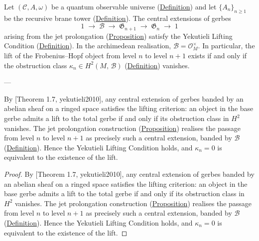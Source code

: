 \begin{proposition}
  \label{prop:yekutieli-lifting}
Let $(\mathcal{C}, A, \omega)$ be a quantum observable universe
(\hyperref[def:quantum-observable-universe]{Definition}) and let
$\{A_n\}_{n \geq 1}$ be the recursive brane tower
(\hyperref[def:recursive-brane-tower]{Definition}).  The central extensions of
gerbes
\[
1 \;\longrightarrow\; \mathcal{B}
  \;\longrightarrow\; \mathfrak{G}_{n+1}
  \;\longrightarrow\; \mathfrak{G}_n
  \;\longrightarrow\; 1
\]
arising from the jet prolongation
(\hyperref[prop:jet-prolongation]{Proposition}) satisfy the Yekutieli Lifting
Condition (\hyperref[def:yekutieli-lifting-condition]{Definition}).  In the
archimedean realisation, $\mathcal{B} = \mathcal{O}_M^{\times}$.  In
particular, the lift of the Frobenius--Hopf object from level $n$ to
level $n{+}1$ exists if and only if the obstruction class
$\kappa_n \in H^2(M,\, \mathcal{B})$
(\hyperref[def:quantum-characteristic-classes]{Definition}) vanishes.

---

By [Theorem 1.7, yekutieli2010], any central extension of gerbes
banded by an abelian sheaf on a ringed space satisfies the lifting
criterion: an object in the base gerbe admits a lift to the total gerbe
if and only if its obstruction class in $H^2$ vanishes.  The jet
prolongation construction
(\hyperref[prop:jet-prolongation]{Proposition}) realises the passage from
level $n$ to level $n{+}1$ as precisely such a central extension,
banded by $\mathcal{B}$
(\hyperref[def:quantum-characteristic-classes]{Definition}).  Hence the
Yekutieli Lifting Condition holds, and $\kappa_n = 0$ is equivalent
to the existence of the lift.
\end{proposition}
\begin{proof}
By [Theorem 1.7, yekutieli2010], any central extension of gerbes
banded by an abelian sheaf on a ringed space satisfies the lifting
criterion: an object in the base gerbe admits a lift to the total gerbe
if and only if its obstruction class in $H^2$ vanishes.  The jet
prolongation construction
(\hyperref[prop:jet-prolongation]{Proposition}) realises the passage from
level $n$ to level $n{+}1$ as precisely such a central extension,
banded by $\mathcal{B}$
(\hyperref[def:quantum-characteristic-classes]{Definition}).  Hence the
Yekutieli Lifting Condition holds, and $\kappa_n = 0$ is equivalent
to the existence of the lift.
\end{proof}

